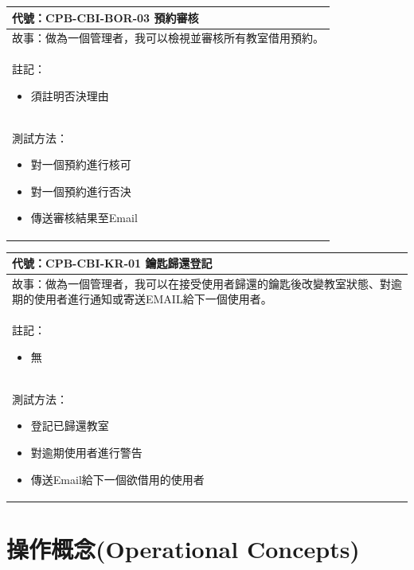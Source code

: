\documentclass{article}
\begin{document}
\begin{table}[H]
	\begin{tabular}{| m{13cm} |}
		\hline
		代號：CPB-CBI-BOR-03	預約審核       \\ \hline
		故事：做為一個管理者，我可以檢視並審核所有教室借用預約。 \\	\hline
		註記：
		\begin{itemize}
			\item 須註明否決理由
		\end{itemize}               \\ \hline
		測試方法：
		\begin{itemize}
			\item 對一個預約進行核可
			\item 對一個預約進行否決
			\item 傳送審核結果至Email
		\end{itemize}
		\\	\hline
	\end{tabular}
\end{table}

\begin{table}[H]
	\begin{tabular}{| m{13cm} |}
		\hline
		代號：CPB-CBI-KR-01	鑰匙歸還登記                                      \\ \hline
		故事：做為一個管理者，我可以在接受使用者歸還的鑰匙後改變教室狀態、對逾期的使用者進行通知或寄送EMAIL給下一個使用者。 \\	\hline
		註記：
		\begin{itemize}
			\item 無
		\end{itemize}                                               \\ \hline
		測試方法：
		\begin{itemize}
			\item 登記已歸還教室
			\item 對逾期使用者進行警告
			\item 傳送Email給下一個欲借用的使用者
		\end{itemize}
		\\	\hline
	\end{tabular}
\end{table}

\newpage

\section[操作概念(OPERATIONAL CONCEPTS)]{操作概念(Operational Concepts)}
\end{document}
